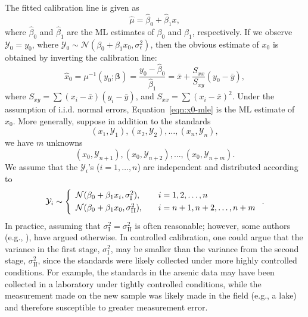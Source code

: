 \documentclass[cmfont,usenames,dvipsnames,leqno]{afit-etd}\usepackage[]{graphicx}\usepackage[]{color}
\newcommand{\mc}[1]{\ensuremath{\mathcal{#1}}}
\newcommand{\wh}[1]{\ensuremath{\widehat{#1}}}
\begin{document}
The fitted calibration line is given as
\begin{equation}
\label{eqn:fitted-slr-model}
  \wh{\mu} = \wh{\beta}_0 + \wh{\beta}_1 x,
\end{equation}
where $\wh{\beta}_0$ and $\wh{\beta}_1$ are the \ac{ML} estimates of $\beta_0$ and $\beta_1$, respectively. If we observe $\mc{Y}_0 = y_0$, where $\mc{Y}_0 \sim \mc{N}(\beta_0 + \beta_1 x_0, \sigma_\epsilon^2)$, then the obvious estimate of $x_0$ is obtained by inverting the calibration line:
\begin{equation}
\label{eqn:x0-mle}
  \wh{x}_0 = \mu^{-1}(y_0; \bm{\beta}) = \frac{y_0 - \wh{\beta}_0}{\wh{\beta}_1} = \bar{x} + \frac{S_{xx}}{S_{xy}}(y_0 - \bar{y}),
\end{equation}
where $S_{xy} = \sum(x_i-\bar{x})(y_i-\bar{y})$, and $S_{xx} = \sum(x_i-\bar{x})^2$. Under the assumption of i.i.d. normal errors, Equation~\eqref{eqn:x0-mle} is the \ac{ML} estimate of $x_0$. More generally, suppose in addition to the standards 
\begin{equation*}
  (x_1, \mc{Y}_1), (x_2, \mc{Y}_2), \dotsc, (x_n, \mc{Y}_n),
\end{equation*}
we have $m$ unknowns
\begin{equation*}
  (x_0, \mc{Y}_{n+1}), (x_0, \mc{Y}_{n+2}), \dotsc, (x_0, \mc{Y}_{n+m}).
\end{equation*}
We assume that the $\mc{Y}_i$'s ($i = 1, \dotsc, n$) are independent and distributed according to
\begin{equation*}
  \mc{Y}_i \sim \left\{
  \begin{array}{l l}
    \mc{N}(\beta_0+\beta_1 x_i, \sigma_{\text{I}}^2), & \quad i=1,2,\dotsc,n \smallskip \\
    \mc{N}(\beta_0+\beta_1 x_0, \sigma_{\text{II}}^2), & \quad i=n+1,n+2,\dotsc,n+m
  \end{array} \right..
\end{equation*}
In practice, assuming that $\sigma_{\text{I}}^2 = \sigma_{\text{II}}^2$ is often reasonable; however, some authors (e.g., \citet[p. 659]{berkson_estimation_1969}), have argued otherwise. In controlled calibration, one could argue that the variance in the first stage, $\sigma_{\text{I}}^2$, may be smaller than the variance from the second stage, $\sigma_{\text{II}}^2$, since the standards were likely collected under more highly controlled conditions. For example, the standards in the arsenic data may have been collected in a laboratory under tightly controlled conditions, while the measurement made on the new sample was likely made in the field (e.g., a lake) and therefore susceptible to greater measurement error. 
\end{document}
